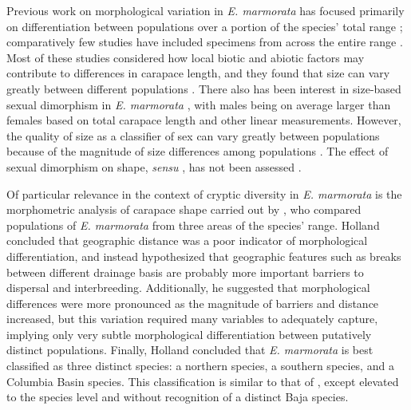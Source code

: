 \documentclass[12pt,letterpaper]{article}
\begin{document}
Previous work on morphological variation in \textit{E. marmorata} has focused primarily on differentiation between populations over a portion of the species' total range \citep{Lubcke2007,Germano2008,Germano2009,Bury2010}; comparatively few studies have included specimens from across the entire range \citep{Holland1992}. Most of these studies considered how local biotic and abiotic factors may contribute to differences in carapace length, and they found that size can vary greatly between different populations \citep{Lubcke2007,Germano2008,Germano2009}. There also has been interest in size-based sexual dimorphism in \textit{E. marmorata} \citep{Holland1992,Lubcke2007,Germano2009}, with males being on average larger than females based on total carapace length and other linear measurements. However, the quality of size as a classifier of sex can vary greatly between populations \citep{Holland1992} because of the magnitude of size differences among populations \citep{Lubcke2007,Germano2009}. The effect of sexual dimorphism on shape, \textit{sensu} \citet{Kendall1977a}, has not been assessed \citep{Holland1992,Lubcke2007,Germano2008}.

Of particular relevance in the context of cryptic diversity in \textit{E. marmorata} is the morphometric analysis of carapace shape carried out by \citet{Holland1992}, who compared populations of \textit{E. marmorata} from three areas of the species' range. Holland concluded that geographic distance was a poor indicator of morphological differentiation, and instead hypothesized that geographic features such as breaks between different drainage basis are probably more important barriers to dispersal and interbreeding. Additionally, he suggested that morphological differences were more pronounced as the magnitude of barriers and distance increased, but this variation required many variables to adequately capture, implying only very subtle morphological differentiation between putatively distinct populations. Finally, Holland concluded that \textit{E. marmorata} is best classified as three distinct species: a northern species, a southern species, and a Columbia Basin species. This classification is similar to that of \citet{Seeliger1945}, except elevated to the species level and without recognition of a distinct Baja species. 
\end{document}
